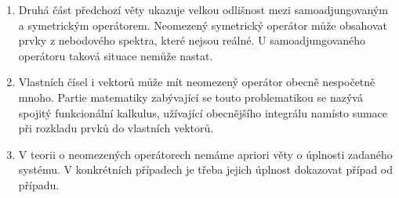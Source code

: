 \begin{remark}
\begin{enumerate}
    \item Druhá část předchozí věty ukazuje velkou odlišnost mezi samoadjungovaným a symetrickým operátorem. Neomezený symetrický operátor může obsahovat prvky z nebodového spektra, které nejsou reálné. U samoadjungovaného operátoru taková situace nemůže nastat.
    \item Vlastních čísel i vektorů může mít neomezený operátor obecně nespočetně mnoho. Partie matematiky zabývající se touto problematikou se nazývá spojitý funkcionální kalkulus, užívající obecnějšího integrálu namísto sumace při rozkladu prvků do vlastních vektorů.
    \item V teorii o neomezených operátorech nemáme apriori věty o úplnosti zadaného systému. V konkrétních případech je třeba jejich úplnost dokazovat případ od případu.
\end{enumerate}
\end{remark}